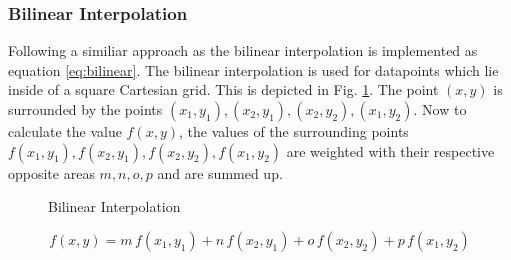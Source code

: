 \documentclass[11pt,twoside,a4paper,fleqn,x11names]{report}
\numberwithin{equation}{chapter}
\numberwithin{figure}{chapter}
\numberwithin{table}{chapter}
\begin{document}
\subsubsection{Bilinear Interpolation}
\label{subsec:binterp}
Following a similiar approach as \cite{bilinear} the bilinear interpolation is implemented as equation \ref{eq:bilinear}. The bilinear interpolation is used for datapoints which lie inside of a square Cartesian grid. This is depicted in Fig. \ref{fig:bilinear}. The point $(x,y)$ is surrounded by the points $(x_1,y_1),(x_2,y_1),(x_2,y_2),(x_1,y_2)$. Now to calculate the value $f(x,y)$, the values of the surrounding points $f(x_1,y_1),f(x_2,y_1),f(x_2,y_2),f(x_1,y_2)$ are weighted with their respective opposite areas $m,n,o,p $ and are summed up. 
\begin{figure}[H]
	\centering
	\caption{Bilinear Interpolation}
	\label{fig:bilinear}	
\end{figure}

\begin{equation}
	f(x,y) = m\,f(x_1,y_1)+n\,f(x_2,y_1)+o\,f(x_2,y_2)+p\,f(x_1,y_2)
	\label{eq:bilinear}
\end{equation}
\end{document}
